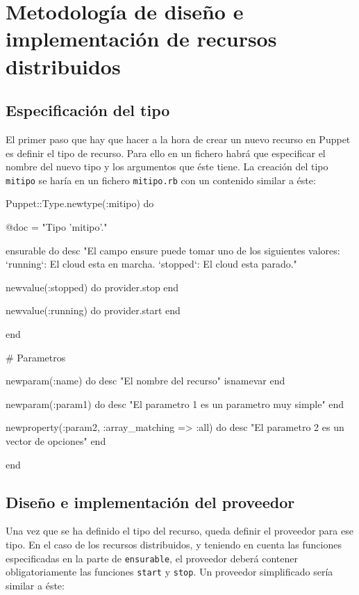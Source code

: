 \chapter{Metodología de diseño e implementación de recursos distribuidos}
\label{cap:disenyo}


\section{Especificación del tipo}

El primer paso que hay que hacer a la hora de crear un nuevo recurso en Puppet es definir el tipo de recurso. Para ello en un fichero habrá que especificar el nombre del nuevo tipo y los argumentos que éste tiene. La creación del tipo \texttt{mitipo} se haría en un fichero \texttt{mitipo.rb} con un contenido similar a éste:

\begin{rubycode}
Puppet::Type.newtype(:mitipo) do

   @doc = "Tipo 'mitipo'."
   
   ensurable do
      desc "El campo ensure puede tomar uno de los siguientes valores:
   `running`: El cloud esta en marcha.
   `stopped`: El cloud esta parado.\n"
   
      newvalue(:stopped) do
         provider.stop
      end

      newvalue(:running) do
         provider.start
      end

   end

   # Parametros
   
   newparam(:name) do
      desc "El nombre del recurso"
      isnamevar
   end

   newparam(:param1) do
      desc "El parametro 1 es un parametro muy simple"
   end
   
   newproperty(:param2, :array_matching => :all) do
      desc "El parametro 2 es un vector de opciones"
   end

end
\end{rubycode}


\section{Diseño e implementación del proveedor}

Una vez que se ha definido el tipo del recurso, queda definir el proveedor para ese tipo. En el caso de los recursos distribuidos, y teniendo en cuenta las funciones especificadas en la parte de \texttt{ensurable}, el proveedor deberá contener obligatoriamente las funciones \texttt{start} y \texttt{stop}. Un proveedor simplificado sería similar a éste:

